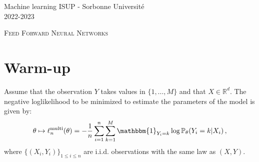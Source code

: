 \documentclass[a4paper,10pt,fleqn]{article}
\newcommand{\1}{\ensuremath{\mathbbm{1}}}
\begin{document}
\noindent Machine learning \hfill ISUP - Sorbonne Universit\'e \\
 2022-2023

\noindent\hrulefill

\begin{center}
\textsc{Feed Forward Neural Networks}
\end{center}
\hrulefill

\medskip



\section*{Warm-up}
Assume that the observation $Y$ takes values in $\{1,\ldots,M\}$ and that $X\in\mathbb{R}^d$. The negative loglikelihood to be minimized to estimate the parameters of the model is given by:
$$
\theta \mapsto \ell^{\mathrm{multi}}_n(\theta)= -\frac{1}{n} \sum_{i=1}^n\sum_{k=1}^{M} \1_{Y_i=k}\log \mathbb{P}_{\theta}(Y_i = k | X_i)\,,
$$
where $\{(X_i,Y_i)\}_{1\leqslant i\leqslant n}$ are i.i.d. observations with the same law as $(X,Y)$. 
\end{document}
